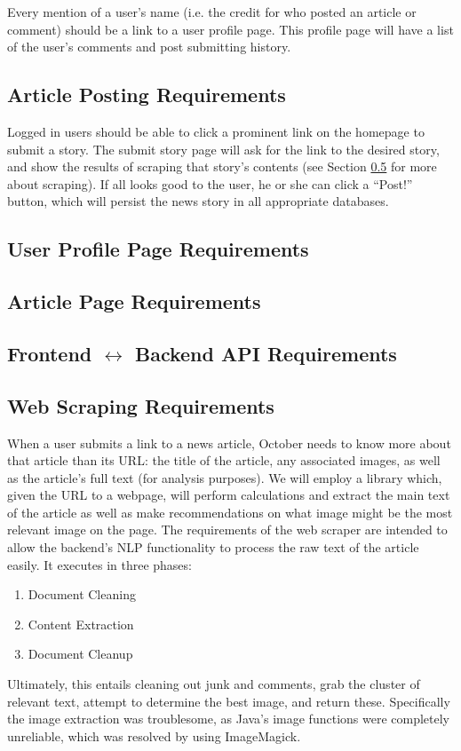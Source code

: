 \documentclass[11pt,letterpaper]{article}
\begin{document}
Every mention of a user's name (i.e. the credit for who posted an article or comment) should be a link to a user profile page. This profile page will have a list of the user's comments and post submitting history.

\subsection{Article Posting Requirements}
Logged in users should be able to click a prominent link on the homepage to submit a story.
The submit story page will ask for the link to the desired story, and show the results of scraping that story's contents (see Section \ref{sec:scraping} for more about scraping).
If all looks good to the user, he or she can click a ``Post!'' button, which will persist the news story in all appropriate databases.

\subsection{User Profile Page Requirements}
\subsection{Article Page Requirements}
\subsection{Frontend $\leftrightarrow$ Backend API Requirements}
\subsection{Web Scraping Requirements}
\label{sec:scraping}
When a user submits a link to a news article, October needs to know more about that article than its URL: the title of the article, any associated images, as well as the article's full text (for analysis purposes).
We will employ a library which, given the URL to a webpage, will perform calculations and extract the main text of the article as well as make recommendations on what image might be the most relevant image on the page.
The requirements of the web scraper are intended to allow the backend's NLP functionality to process the raw text of the article easily. It executes in three phases:
\begin{enumerate}
  \item Document Cleaning
  \item Content Extraction
  \item Document Cleanup
\end{enumerate}
Ultimately, this entails cleaning out junk and comments, grab the cluster of relevant text, attempt to determine the best image, and return these. Specifically the image extraction was troublesome, as Java's image functions were completely unreliable, which was resolved by using ImageMagick.
\end{document}
